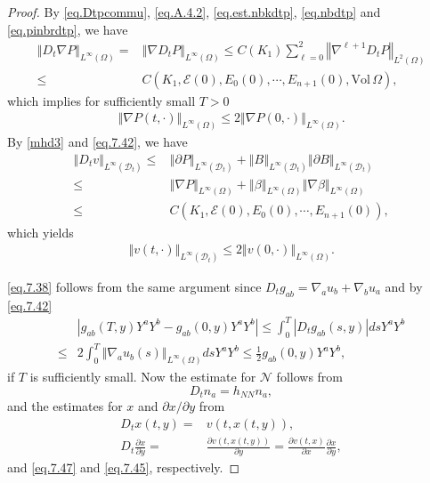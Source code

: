 \documentclass[12pt,reqno]{amsart}
\numberwithin{equation}{section}
\theoremstyle{definition}
\theoremstyle{remark}
\begin{document}
\begin{proof}
By \eqref{eq.Dtpcommu}, \eqref{eq.A.4.2}, \eqref{eq.est.nbkdtp}, \eqref{eq.nbdtp} and \eqref{eq.pinbrdtp}, we have
 \begin{align*}
   {\left\Vert{D_t{\nabla} {P }}\right\Vert}_{L^\infty(\Omega)}=&{\left\Vert{{\nabla} D_t{P }}\right\Vert}_{L^\infty(\Omega)}{\leqslant} C(K_1)\sum_{\ell=0}^2{\left\Vert{{\nabla}^{\ell+1} D_t{P }}\right\Vert}_{L^2(\Omega)}\\
   {\leqslant} & C(K_1,{\mathcal{E}}(0),E_0(0),\cdots, E_{n+1}(0),{\mathrm{Vol}\,}\Omega),
 \end{align*}
 which implies for sufficiently small $T>0$
 \begin{align}
   {\left\Vert{{\nabla}{P }(t,\cdot)}\right\Vert}_{L^\infty(\Omega)}{\leqslant} 2{\left\Vert{{\nabla}{P }(0,\cdot)}\right\Vert}_{L^\infty(\Omega)}.
 \end{align}
 By \eqref{mhd3} and \eqref{eq.7.42}, we have
 \begin{align}
   {\left\Vert{D_t{v}}\right\Vert}_{L^\infty({{\mathscr{D}_t}})}{\leqslant}& {\left\Vert{{\partial} {P }}\right\Vert}_{L^\infty({{\mathscr{D}_t}})}+{\left\Vert{B}\right\Vert}_{L^\infty({{\mathscr{D}_t}})}{\left\Vert{{\partial}{B}}\right\Vert}_{L^\infty({{\mathscr{D}_t}})}\\
   {\leqslant}&{\left\Vert{{\nabla} {P }}\right\Vert}_{L^\infty(\Omega)}+{\left\Vert{\beta}\right\Vert}_{L^\infty(\Omega)}{\left\Vert{{\nabla}\beta}\right\Vert}_{L^\infty(\Omega)}\\
   {\leqslant}&C(K_1,{\mathcal{E}}(0),E_0(0),\cdots, E_{n+1}(0)),
 \end{align}
 which yields
 \begin{align}\label{eq.7.47}
   {\left\Vert{{v}(t,\cdot)}\right\Vert}_{L^\infty({{\mathscr{D}_t}})}{\leqslant} 2{\left\Vert{{v}(0,\cdot)}\right\Vert}_{L^\infty(\Omega)}.
 \end{align}

 \eqref{eq.7.38} follows from the same argument since $D_t g_{ab}={\nabla}_a u_b+{\nabla}_b u_a$ and by \eqref{eq.7.42}
 \begin{align}
   &{\left\vert{g_{ab}(T,y)Y^aY^b-g_{ab}(0,y)Y^aY^b}\right\vert}
   {\leqslant} \int_0^T{\left\vert{D_t g_{ab}(s,y)}\right\vert} ds Y^aY^b\\
   {\leqslant}&2\int_0^T{\left\Vert{{\nabla}_a u_b(s)}\right\Vert}_{L^\infty(\Omega)} ds Y^aY^b {\leqslant} \frac{1}{2}g_{ab}(0,y)Y^aY^b,
 \end{align}
 if $T$ is sufficiently small. Now the estimate for ${\mathcal{N}}$ follows from
 $$D_t n_a=h_{NN} n_a,$$
 and the estimates for $x$ and ${\partial} x/{\partial} y$ from
 \begin{align}
   D_t x(t,y)=&v(t,x(t,y)),\\
   D_t\frac{{\partial} x}{{\partial} y} =&\frac{{\partial} {v}(t,x(t,y))}{{\partial} y} =\frac{{\partial} {v}(t,x)}{{\partial} x}\frac{{\partial} x}{{\partial} y},
 \end{align}
 and \eqref{eq.7.47} and \eqref{eq.7.45}, respectively.
\end{proof}
\end{document}
